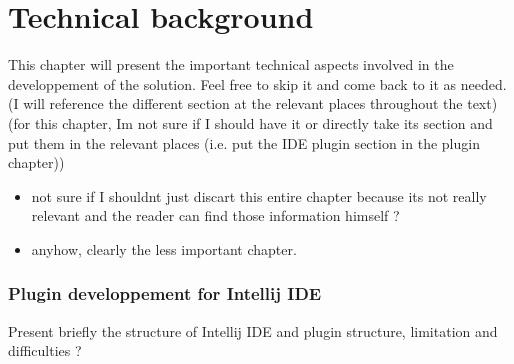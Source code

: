 %
\chapter{Technical background}
%
This chapter will present the important technical aspects involved in the developpement of the solution. Feel free to skip it and come back to it
as needed. (I will reference the different section at the relevant places throughout the text) (for this chapter, Im not sure if I should
have it or directly take its section and put them in the relevant places (i.e. put the IDE plugin section in the plugin chapter))

\begin{itemize}
	\item not sure if I shouldnt just discart this entire chapter because its not really relevant and the reader can find those information himself ?
	\item anyhow, clearly the less important chapter.
\end{itemize}

		\subsection{Plugin developpement for Intellij IDE}
Present briefly the structure of Intellij IDE and plugin structure, limitation and difficulties ? 


